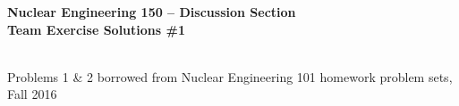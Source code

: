 \documentclass{report}
\begin{document}
\begin{center}
\textbf{\large Nuclear Engineering 150 -- Discussion Section}\\ 
\textbf{Team Exercise Solutions \#1}

\-\\
{\small *Problems 1 \& 2 borrowed from Nuclear Engineering 101 homework problem sets, Fall 2016}
\end{center}




\newpage



\newpage



\newpage



\end{document}
